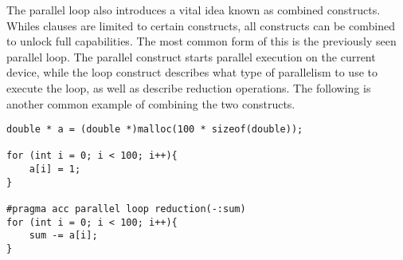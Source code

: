 The parallel loop also introduces a vital idea known as combined constructs. Whiles clauses are limited to certain constructs, all constructs can be combined to unlock full capabilities. The most common form of this is the previously seen parallel loop. The parallel construct starts parallel execution on the current device, while the loop construct describes what type of parallelism to use to execute the loop, as well as describe reduction operations. The following is another common example of combining the two constructs.

\begin{Code}
\begin{lstlisting}[frame=single, caption= combinedConstructs.c, label=prototype, numbers=none]
double * a = (double *)malloc(100 * sizeof(double));

for (int i = 0; i < 100; i++){
    a[i] = 1;
}

#pragma acc parallel loop reduction(-:sum)
for (int i = 0; i < 100; i++){
    sum -= a[i];
}
\end{lstlisting}
\end{Code}

